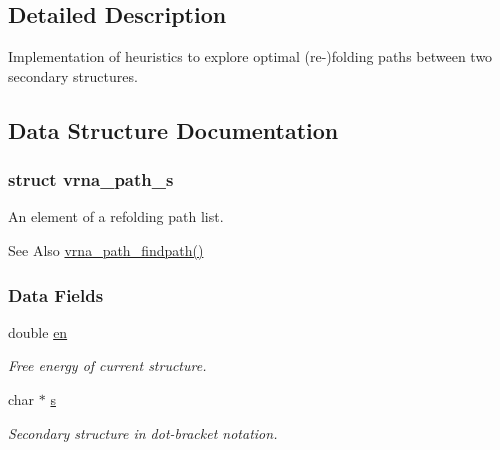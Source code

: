 \subsection{Detailed Description}
Implementation of heuristics to explore optimal (re-\/)folding paths between two secondary structures. 

\subsection{Data Structure Documentation}
\label{structvrna__path__s}
\hypertarget{group__direct__paths_structvrna__path__s}{}
\subsubsection{struct vrna\-\_\-path\-\_\-s}
An element of a refolding path list. 

\begin{DoxySeeAlso}{See Also}
\hyperlink{group__direct__paths_ga5e1f97f58adc65016a8df88802dc16b5}{vrna\-\_\-path\-\_\-findpath()} 
\end{DoxySeeAlso}
\subsubsection*{Data Fields}
\begin{DoxyCompactItemize}
\item 
\hypertarget{group__direct__paths_ac25160bf31d28097358278f367e41227}{double \hyperlink{group__direct__paths_ac25160bf31d28097358278f367e41227}{en}}\label{group__direct__paths_ac25160bf31d28097358278f367e41227}

\begin{DoxyCompactList}\small\item\em Free energy of current structure. \end{DoxyCompactList}\item 
\hypertarget{group__direct__paths_a141b70a59cb81d10bc65bbb7a0f6db77}{char $\ast$ \hyperlink{group__direct__paths_a141b70a59cb81d10bc65bbb7a0f6db77}{s}}\label{group__direct__paths_a141b70a59cb81d10bc65bbb7a0f6db77}

\begin{DoxyCompactList}\small\item\em Secondary structure in dot-\/bracket notation. \end{DoxyCompactList}\end{DoxyCompactItemize}


